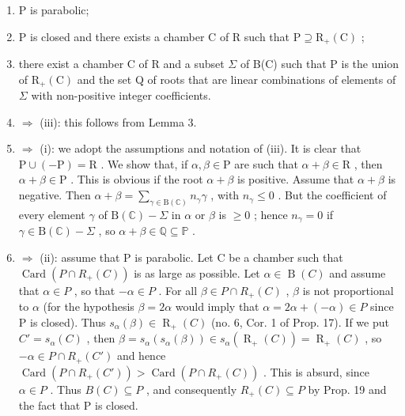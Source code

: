 \begin{enumerate}
\def\labelenumi{(\roman{enumi})}
\item
  P is parabolic;
\item
  P is closed and there exists a chamber C of R such that \(\mathrm{P} \supseteq \mathrm{R}_{+}(\mathrm{C})\) ;
\item
  there exist a chamber C of R and a subset \(\Sigma\) of B(C) such that P is the union of \(\mathrm{R}_{+}(\mathrm{C})\) and the set Q of roots that are linear combinations of elements of \(\Sigma\) with non-positive integer coefficients.
\item
  \(\Longrightarrow\) (iii): this follows from Lemma 3.
\item
  \(\Longrightarrow\) (i): we adopt the assumptions and notation of (iii). It is clear that \(\mathrm{P} \cup (-\mathrm{P}) = \mathrm{R}\) . We show that, if \(\alpha, \beta \in \mathrm{P}\) are such that \(\alpha + \beta \in \mathrm{R}\) , then \(\alpha + \beta \in \mathrm{P}\) . This is obvious if the root \(\alpha + \beta\) is positive. Assume that \(\alpha + \beta\) is negative. Then \(\alpha + \beta = \sum_{\gamma \in \mathrm{B}(\mathbb{C})} n_{\gamma} \gamma\) , with \(n_{\gamma} \leqslant 0\) . But the coefficient of every element \(\gamma\) of \(\mathrm{B}(\mathbb{C}) - \Sigma\) in \(\alpha\) or \(\beta\) is \(\geqslant 0\) ; hence \(n_{\gamma} = 0\) if \(\gamma \in \mathrm{B}(\mathbb{C}) - \Sigma\) , so \(\alpha + \beta \in \mathbb{Q} \subseteq \mathbb{P}\) .
\item
  \(\Longrightarrow\) (ii): assume that P is parabolic. Let C be a chamber such that \(\operatorname{Card}(P\cap R_{+}(C))\) is as large as possible. Let \(\alpha\in\operatorname{B}(C)\) and assume that \(\alpha\in P\) , so that \(-\alpha\in P\) . For all \(\beta\in P\cap R_{+}(C)\) , \(\beta\) is not proportional to \(\alpha\) (for the hypothesis \(\beta=2\alpha\) would imply that \(\alpha=2\alpha+(-\alpha)\in P\) since P is closed). Thus \(s_{\alpha}(\beta)\in\operatorname{R}_{+}(C)\) (no. 6, Cor. 1 of Prop. 17). If we put \(C'=s_{\alpha}(C)\) , then \(\beta=s_{\alpha}(s_{\alpha}(\beta))\in s_{\alpha}(\operatorname{R}_{+}(C))=\operatorname{R}_{+}(C)\) , so \(-\alpha\in P\cap R_{+}(C')\) and hence \(\operatorname{Card}(P\cap R_{+}(C'))>\operatorname{Card}(P\cap R_{+}(C))\) . This is absurd, since \(\alpha\in P\) . Thus \(B(C)\subseteq P\) , and consequently \(R_{+}(C)\subseteq P\) by Prop. 19 and the fact that P is closed.
\end{enumerate}

